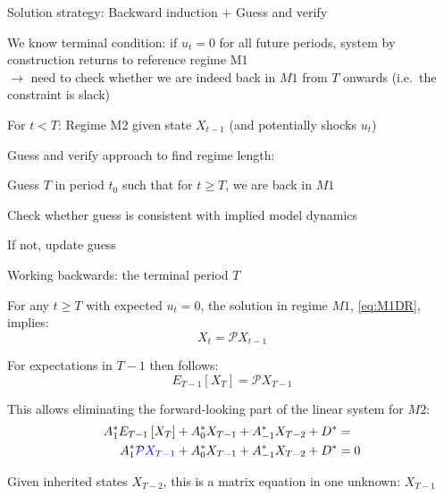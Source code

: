 \begin{frame}{Solution strategy: Backward induction + Guess and verify}
\begin{wideitemize}
\item We know terminal condition: if $u_{t} = 0$ for all future periods, system by construction returns to reference regime M1\\
$\rightarrow$ need to check whether we are indeed back in $M1$ from $T$ onwards (i.e.\ the constraint is slack)
\item For $t<T$: Regime M2 given state $X_{t-1}$ (and potentially shocks $u_t$)
\item Guess and verify approach to find regime length:
\begin{wideenumerate}
	\item Guess $T$ in period $t_0$ such that for $t \geq T$, we are back in $M1$
	\item Check whether guess is consistent with implied model dynamics
	\item If not, update guess
\end{wideenumerate}
\end{wideitemize}
\end{frame}

\begin{frame}{Working backwards: the terminal period $T$}
\begin{wideitemize}
\item For any $t \geq T$ with expected $u_t=0$, the solution in regime $M1$, \eqref{eq:M1DR}, implies:
\begin{equation}
X_{t} = \mathcal{P}X_{t-1}
\end{equation}
\item For expectations in $T-1$ then follows:
\begin{equation}
E_{T-1}\left[X_{T}\right]=\mathcal{P}X_{T-1}
\end{equation}
\item This allows eliminating the forward-looking part of the linear system for $M2$:
\begin{equation}
\begin{split}
A_1^{\ast}E_{T-1}\left[X_{T}\right] + A_0^{\ast}X_{T-1}  + A_{-1}^{\ast}X_{T-2} + D^{\ast}&=\\
A_1^{\ast}{\color{blue}\mathcal{P}X_{T-1}} + A_0^{\ast}X_{T-1}  + A_{-1}^{\ast}X_{T-2} + D^{\ast}&= 0
  \end{split}
\end{equation}
\item Given inherited states $X_{T-2}$, this is a matrix equation in one unknown: $X_{T-1}$
\end{wideitemize}
\end{frame}

